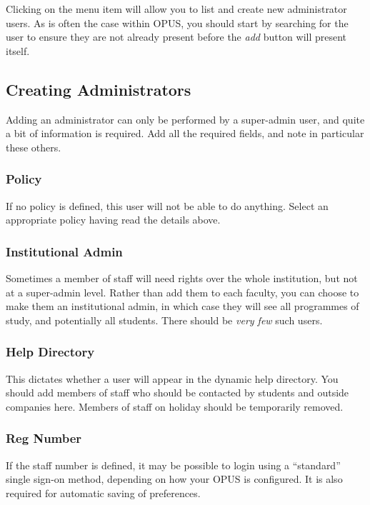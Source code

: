 \documentclass[12 pt]{book}
\begin{document}
Clicking on the  menu item will 
allow you to list and create new administrator users. As is often the case 
within OPUS, you should start by searching for the user to ensure they are not
already present before the \emph{add} button will present itself.

\subsection{Creating Administrators}

Adding an administrator can only be performed by a super-admin user, and quite
a bit of information is required. Add all the required fields, and note in
particular these others.

\subsubsection{Policy}

If no policy is defined, this user will not be able to do anything. Select an
appropriate policy having read the details above.

\subsubsection{Institutional Admin}

Sometimes a member of staff will need rights over the whole institution, but
not at a super-admin level. Rather than add them to each faculty, you can
choose to make them an institutional admin, in which case they will see all
programmes of study, and potentially all students. There should be 
\emph{very few} such users.

\subsubsection{Help Directory}

This dictates whether a user will appear in the dynamic help directory. You
should add members of staff who should be contacted by students and outside
companies here. Members of staff on holiday should be temporarily removed.

\subsubsection{Reg Number}

If the staff number is defined, it may be possible to login using a ``standard''
single sign-on method, depending on how your OPUS is configured. It is also
required for automatic saving of preferences.
\end{document}
